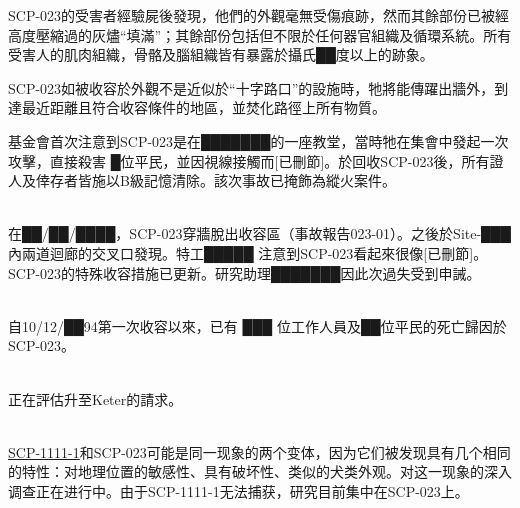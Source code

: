 SCP-023的受害者經驗屍後發現，他們的外觀毫無受傷痕跡，然而其餘部份已被經高度壓縮過的灰燼“填滿”；其餘部份包括但不限於任何器官組織及循環系統。所有受害人的肌肉組織，骨骼及腦組織皆有暴露於攝氏██度以上的跡象。

SCP-023如被收容於外觀不是近似於“十字路口”的設施時，牠將能傳躍出牆外，到達最近距離且符合收容條件的地區，並焚化路徑上所有物質。

基金會首次注意到SCP-023是在███████的一座教堂，當時牠在集會中發起一次攻擊，直接殺害 █位平民，並因視線接觸而[已刪節]。於回收SCP-023後，所有證人及倖存者皆施以B級記憶清除。該次事故已掩飾為縱火案件。

\\
在██\slash ██\slash ████，SCP-023穿牆脫出收容區（事故報告023-01）。之後於Site-███內兩道迴廊的交叉口發現。特工█████ 注意到SCP-023看起來很像[已刪節]。SCP-023的特殊收容措施已更新。研究助理███████因此次過失受到申誡。

\\
自10\slash 12\slash ██94第一次收容以來，已有 ███ 位工作人員及██位平民的死亡歸因於SCP-023。

\\
正在評估升至Keter的請求。

\\\hyperref[chap:SCP-1111]{SCP-1111-1}和SCP-023可能是同一现象的两个变体，因为它们被发现具有几个相同的特性：对地理位置的敏感性、具有破坏性、类似的犬类外观。对这一现象的深入调查正在进行中。由于SCP-1111-1无法捕获，研究目前集中在SCP-023上。




